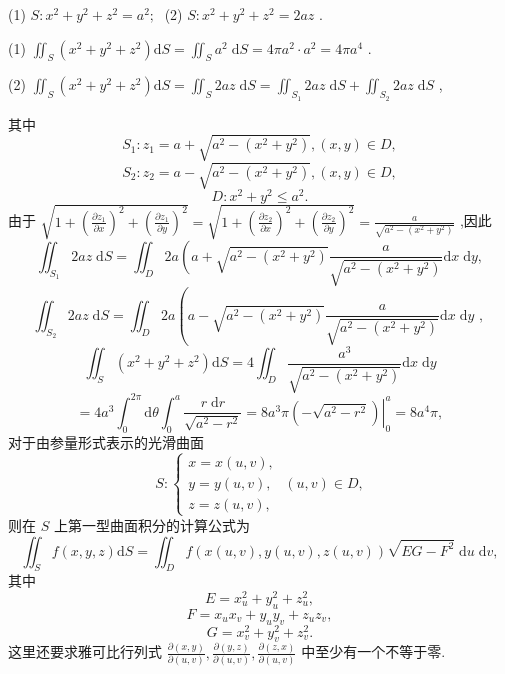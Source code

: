 (1) \(S : {x}^{2} + {y}^{2} + {z}^{2} = {a}^{2};\;\) (2) \(S : {x}^{2} + {y}^{2} + {z}^{2} = {2az}\) .

\begin{solution}

\end{solution}
(1) \({\iint }_{S}\left( {{x}^{2} + {y}^{2} + {z}^{2}}\right) \mathrm{d}S = {\iint }_{S}{a}^{2}\mathrm{\;d}S = {4\pi }{a}^{2} \cdot  {a}^{2} = {4\pi }{a}^{4}\) .

(2) \({\iint }_{S}\left( {{x}^{2} + {y}^{2} + {z}^{2}}\right) \mathrm{d}S = {\iint }_{S}{2az}\mathrm{\;d}S = {\iint }_{{S}_{1}}{2az}\mathrm{\;d}S + {\iint }_{{S}_{2}}{2az}\mathrm{\;d}S\) ,

其中
\[
{S}_{1} : {z}_{1} = a + \sqrt{{a}^{2} - \left( {{x}^{2} + {y}^{2}}\right) },\left( {x,y}\right)  \in  D,
\]
\[
{S}_{2} : {z}_{2} = a - \sqrt{{a}^{2} - \left( {{x}^{2} + {y}^{2}}\right) },\left( {x,y}\right)  \in  D,
\]
\[
D : {x}^{2} + {y}^{2} \leq  {a}^{2}.
\]
由于 \(\sqrt{1 + {\left( \frac{\partial {z}_{1}}{\partial x}\right) }^{2} + {\left( \frac{\partial {z}_{1}}{\partial y}\right) }^{2}} = \sqrt{1 + {\left( \frac{\partial {z}_{2}}{\partial x}\right) }^{2} + {\left( \frac{\partial {z}_{2}}{\partial y}\right) }^{2}} = \frac{a}{\sqrt{{a}^{2} - \left( {{x}^{2} + {y}^{2}}\right) }}\) ,因此
\[
{\iint }_{{S}_{1}}{2az}\mathrm{\;d}S = {\iint }_{D}{2a}\left( {a + \sqrt{{a}^{2} - \left( {{x}^{2} + {y}^{2}}\right) }}\right. \frac{a}{\sqrt{{a}^{2} - \left( {{x}^{2} + {y}^{2}}\right) }}\mathrm{d}x\mathrm{\;d}y,
\]
\[
{\iint }_{{S}_{2}}{2az}\mathrm{\;d}S = {\iint }_{D}{2a}\left( {a - \sqrt{{a}^{2} - \left( {{x}^{2} + {y}^{2}}\right) }\frac{a}{\sqrt{{a}^{2} - \left( {{x}^{2} + {y}^{2}}\right) }}\mathrm{d}x\mathrm{\;d}y}\right. \text{ , }
\]
\[
{\iint }_{S}\left( {{x}^{2} + {y}^{2} + {z}^{2}}\right) \mathrm{d}S = 4{\iint }_{D}\frac{{a}^{3}}{\sqrt{{a}^{2} - \left( {{x}^{2} + {y}^{2}}\right) }}\mathrm{d}x\mathrm{\;d}y
\]
\[
= 4{a}^{3}{\int }_{0}^{2\pi }\mathrm{d}\theta {\int }_{0}^{a}\frac{r\mathrm{\;d}r}{\sqrt{{a}^{2} - {r}^{2}}} = {\left. 8{a}^{3}\pi \left( -\sqrt{{a}^{2} - {r}^{2}}\right) \right| }_{0}^{a} = 8{a}^{4}\pi ,
\]
对于由参量形式表示的光滑曲面
\[
S : \left\{  {\begin{array}{l} x = x\left( {u,v}\right) , \\  y = y\left( {u,v}\right) , \\  z = z\left( {u,v}\right) , \end{array}\;\left( {u,v}\right)  \in  D,}\right.
\]
则在 \(S\) 上第一型曲面积分的计算公式为
\[
{\iint }_{S}f\left( {x,y,z}\right) \mathrm{d}S = {\iint }_{D}f\left( {x\left( {u,v}\right) ,y\left( {u,v}\right) ,z\left( {u,v}\right) }\right) \sqrt{{EG} - {F}^{2}}\mathrm{\;d}u\mathrm{\;d}v, \tag{3}
\]
其中
\[
E = {x}_{u}^{2} + {y}_{u}^{2} + {z}_{u}^{2},
\]
\[
F = {x}_{u}{x}_{v} + {y}_{u}{y}_{v} + {z}_{u}{z}_{v},
\]
\[
G = {x}_{v}^{2} + {y}_{v}^{2} + {z}_{v}^{2}.
\]
这里还要求雅可比行列式 \(\frac{\partial \left( {x,y}\right) }{\partial \left( {u,v}\right) },\frac{\partial \left( {y,z}\right) }{\partial \left( {u,v}\right) },\frac{\partial \left( {z,x}\right) }{\partial \left( {u,v}\right) }\) 中至少有一个不等于零.

